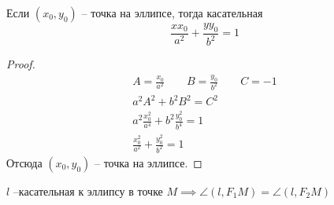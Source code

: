 
\begin{theorem}
    Если $(x_0, y_0)$  -- точка на эллипсе, тогда касательная
    \[\frac{xx_0}{a^2} + \frac{yy_0}{b^2}=1\]
\end{theorem}
\begin{proof}
    \begin{gather*}
        A = \frac{x_0}{a^2} \qquad B = \frac{y_0}{b^2} \qquad C = -1\\
        a^2 A^2 + b^2B^2 = C^2\\
        a^2 \frac{x_0^2}{a^4} + b^2 \frac{y_0^2}{b^4} = 1\\
        \frac{x_0^2}{a^2} + \frac{y_0^2}{b^2} = 1
    \end{gather*}
    Отсюда $(x_0, y_0)$ -- точка на эллипсе.
\end{proof}

\begin{theorem}
    $l$ --касательная к эллипсу в точке $M \implies \angle(l, F_1M) = \angle(l, F_2M)$
\end{theorem}

